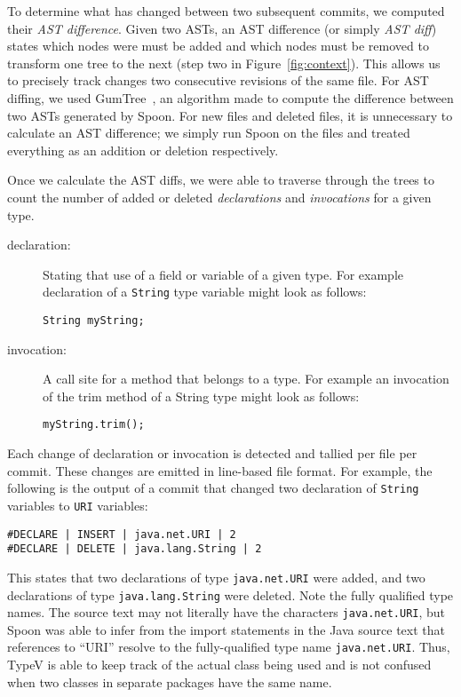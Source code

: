 To determine what has changed between two subsequent commits, we computed their \emph{AST difference}. Given two ASTs, an AST difference (or simply \emph{AST diff}) states which nodes were must be added and which nodes must be removed to transform one tree to the next (step two in Figure~\ref{fig:context}). This allows us to precisely track changes two consecutive revisions of the same file. For AST diffing, we used GumTree~\cite{falleri:hal-01054552}, an algorithm made to compute the difference between two ASTs generated by Spoon. For new files and deleted files, it is unnecessary to calculate an AST difference; we simply run Spoon on the files and treated everything as an addition or deletion respectively.

Once we calculate the AST diffs, we were able to traverse through the trees to count the number of added or deleted \emph{declarations} and \emph{invocations} for a given type.

\begin{description}
\item [declaration:] 
  Stating that use of a field or variable of a given type. For example declaration of a \texttt{String} type variable might look as follows:
  \\
  \begin{adjustwidth}{2.5em}{0pt}
  \texttt{String myString;} \\
  \end{adjustwidth}
\item [invocation:] 
  A call site for a method that belongs to a type. For example an invocation of the trim method of a String type might look as follows:
  \\
  \begin{adjustwidth}{2.5em}{0pt}
  \texttt{myString.trim();} \\
  \end{adjustwidth}
\end{description}

Each change of declaration or invocation is detected and tallied per file per commit. These changes are emitted in line-based file format. For example, the following is the output of a commit that changed two declaration of \texttt{String} variables to \texttt{URI} variables:

\begin{verbatim}
#DECLARE | INSERT | java.net.URI | 2
#DECLARE | DELETE | java.lang.String | 2
\end{verbatim}

This states that two declarations of type \texttt{java.net.URI} were added, and two declarations of type \texttt{java.lang.String} were deleted. Note the fully qualified type names. The source text may not literally have the characters \texttt{java.net.URI}, but Spoon was able to infer from the import statements in the Java source text that references to ``URI'' resolve to the fully-qualified type name \texttt{java.net.URI}. Thus, TypeV is able to keep track of the actual class being used and is not confused when two classes in separate packages have the same name.

